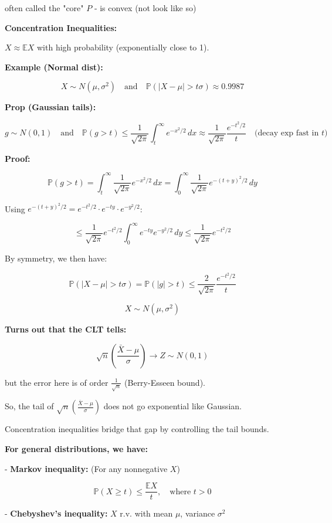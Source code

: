 \documentclass[12pt]{article}
\begin{document}
often called the "core" \hspace{2cm} $P$ - is convex (not look like so)

\textbf{Concentration Inequalities:}

$X \approx \mathbb{E}X$ with high probability (exponentially close to 1).

\textbf{Example (Normal dist):} 

\[ X \sim N(\mu, \sigma^2) \quad \text{and} \quad \mathbb{P}(|X - \mu| > t\sigma) \approx 0.9987 \]

\textbf{Prop (Gaussian tails):}

\[ g \sim N(0,1) \quad \text{and} \quad \mathbb{P}(g > t) \leq \frac{1}{\sqrt{2\pi}} \int_{t}^{\infty} e^{-x^2/2} \, dx \approx \frac{1}{\sqrt{2\pi}} \frac{e^{-t^2/2}}{t} \quad \text{(decay exp fast in $t$)} \]

\textbf{Proof:}

\[ \mathbb{P}(g > t) = \int_{t}^{\infty} \frac{1}{\sqrt{2\pi}} e^{-x^2/2} \, dx = \int_{0}^{\infty} \frac{1}{\sqrt{2\pi}} e^{-(t+y)^2/2} \, dy \]

Using \( e^{-(t+y)^2/2} = e^{-t^2/2} \cdot e^{-ty} \cdot e^{-y^2/2} \):

\[ \leq \frac{1}{\sqrt{2\pi}} e^{-t^2/2} \int_{0}^{\infty} e^{-ty} e^{-y^2/2} \, dy \leq \frac{1}{\sqrt{2\pi}} e^{-t^2/2} \]

By symmetry, we then have:

\[ \mathbb{P}(|X - \mu| > t\sigma) = \mathbb{P}(|g| > t) \leq \frac{2}{\sqrt{2\pi}} \frac{e^{-t^2/2}}{t} \]

\[ X \sim N(\mu, \sigma^2) \]

\textbf{Turns out that the CLT tells:}

\[ \sqrt{n} \left(\frac{\bar{X} - \mu}{\sigma}\right) \to Z \sim N(0,1) \]

but the error here is of order \( \frac{1}{\sqrt{n}} \) (Berry-Esseen bound).

So, the tail of \( \sqrt{n} \left(\frac{\bar{X} - \mu}{\sigma}\right) \) does not go exponential like Gaussian. 

Concentration inequalities bridge that gap by controlling the tail bounds.

\textbf{For general distributions, we have:}

- \textbf{Markov inequality:} (For any nonnegative \( X \))

\[ \mathbb{P}(X \geq t) \leq \frac{\mathbb{E}X}{t}, \quad \text{where } t > 0 \]

- \textbf{Chebyshev's inequality:} \( X \) r.v. with mean \( \mu \), variance \( \sigma^2 \)
\end{document}
